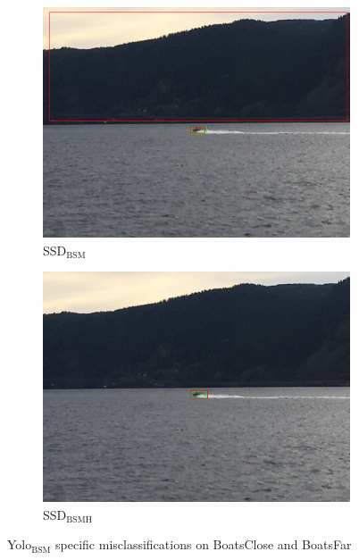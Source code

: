 \begin{figure}[h!]
\begin{subfigure}{.5\textwidth}
  \centering
  \includegraphics[width=0.75\linewidth]{results/case_buildings/ssdtrf/ssd2/grov2/IMG_2325.jpg}
  \caption{SSD$_{\text{BSM}}$}
\end{subfigure}%
\begin{subfigure}{.5\textwidth}
  \centering
  \includegraphics[width=.75\linewidth]{results/case_buildings/ssdtrf/ssd3/grov2/IMG_2325.jpg}
  \caption{SSD$_{\text{BSMH}}$}
\end{subfigure}
\caption{Yolo$_{\text{BSM}}$ specific misclassifications on BoatsClose and BoatsFar}
\label{img:yolo2_misclas}


\end{figure}
